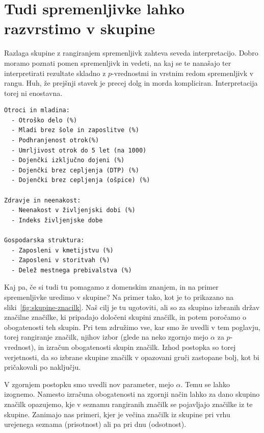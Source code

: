 \section{Tudi spremenljivke lahko razvrstimo v skupine}

Razlaga skupine z rangiranjem spremenljivk zahteva seveda interpretacijo. Dobro moramo poznati pomen spremenljivk in vedeti, na kaj se te nanašajo ter interpretirati rezultate skladno z $p$-vrednostmi in vrstnim redom spremenljivk v rangu. Huh, že prejšnji stavek je precej dolg in morda kompliciran. Interpretacija torej ni enostavna.

\begin{marginfigure}
\caption{Socioekonomske značilke razvrščene v skupine.}
\label{fig:skupine-znacilk}
\footnotesize
\begin{verbatim}
Otroci in mladina:
  - Otroško delo (%)
  - Mladi brez šole in zaposlitve (%)
  - Podhranjenost otrok(%)
  - Umrljivost otrok do 5 let (na 1000)
  - Dojenčki izključno dojeni (%)
  - Dojenčki brez cepljenja (DTP) (%)
  - Dojenčki brez cepljenja (ošpice) (%)

Zdravje in neenakost:
  - Neenakost v življenjski dobi (%)
  - Indeks življenjske dobe

Gospodarska struktura:
  - Zaposleni v kmetijstvu (%)
  - Zaposleni v storitvah (%)
  - Delež mestnega prebivalstva (%)
\end{verbatim}
\end{marginfigure}

Kaj pa, če si tudi tu pomagamo z domenskim znanjem, in na primer spremenljivke uredimo v skupine? Na primer tako, kot je to prikazano na sliki~\ref{fig:skupine-znacilk}. Naš cilj je tu ugotoviti, ali so za skupino izbranih držav značilne značilke, ki pripadajo določeni skupini značilk, in potem poročamo o obogatenosti teh skupin. Pri tem združimo vse, kar smo že uvedli v tem poglavju, torej rangiranje značilk, njihov izbor (glede na neko zgornjo mejo $\alpha$ za $p$-vrednost), in izračun obogatenosti skupin značilk. Izhod postopka so torej verjetnosti, da so izbrane skupine značilk v opazovani gruči zastopane bolj, kot bi pričakovali po naključju.

V zgornjem postopku smo uvedli nov parameter, mejo $\alpha$. Temu se lahko izognemo. Namesto izračuna obogatenosti na zgornji način lahko za dano skupino značilk opazujemo, kje v seznamu rangiranih značilk se pojavljajo značilke iz te skupine. Zanimajo nas primeri, kjer je večina značilk iz skupine pri vrhu urejenega seznama (prisotnost) ali pa pri dnu (odsotnost).

